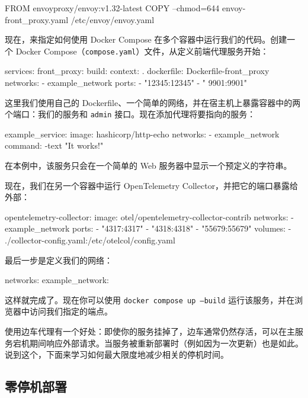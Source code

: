 \begin{codebox}[docker]
FROM envoyproxy/envoy:v1.32-latest
COPY --chmod=644 envoy-front_proxy.yaml /etc/envoy/envoy.yaml
\end{codebox}

\label{idx:415}
现在，来指定如何使用 Docker Compose 在多个容器中运行我们的代码。创建一个 Docker Compose（\texttt{compose.\allowbreak{}yaml}）文件，从定义前端代理服务开始：

\begin{codebox}[yaml]
services:
  front_proxy:
    build:
      context: .
      dockerfile: Dockerfile-front_proxy
    networks:
      - example_network
    ports:
      - "12345:12345"
      - "
9901:9901"
\end{codebox}

这里我们使用自己的 Dockerfile、一个简单的网络，并在宿主机上暴露容器中的两个端口：我们的服务和 \texttt{admin} 接口。现在添加代理将要指向的服务：

\begin{codebox}[yaml]
  example_service:
    image: hashicorp/http-echo
    networks:
      - example_network
    command: -text "It works!"
\end{codebox}

在本例中，该服务只会在一个简单的 Web 服务器中显示一个预定义的字符串。

\label{idx:416}
现在，我们在另一个容器中运行 OpenTelemetry Collector，并把它的端口暴露给外部：

\begin{codebox}[yaml]
  opentelemetry-collector:
    image: otel/opentelemetry-collector-contrib
    networks:
      - example_network
    ports:
      - "4317:4317"
      - "4318:4318"
      - "55679:55679"
    volumes:
      - ./collector-config.yaml:/etc/otelcol/config.yaml
\end{codebox}

最后一步是定义我们的网络：

\begin{codebox}[yaml]
networks:
  example_network: {}
\end{codebox}

\label{idx:417}
这样就完成了。现在你可以使用 \texttt{docker compose up --build} 运行该服务，并在浏览器中访问我们指定的端点。

使用边车代理有一个好处：即使你的服务挂掉了，边车通常仍然存活，可以在主服务宕机期间响应外部请求。当服务被重新部署时（例如因为一次更新）也是如此。说到这个，下面来学习如何最大限度地减少相关的停机时间。

\subsection{零停机部署}

